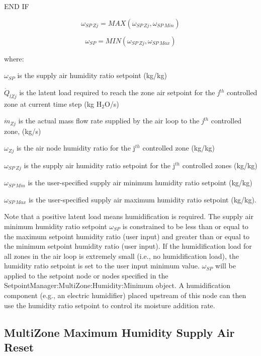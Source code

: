 END IF

\begin{equation}
{\omega_{SP~Zj}} = MAX\left( {{\omega_{SP~Zj}},{\omega_{SP~Min}}} \right)
\end{equation}

\begin{equation}
{\omega_{SP}} = MIN\left( {{\omega_{SP~Zj}},{\omega_{SP~Max}}} \right)
\end{equation}

where:

\({\omega_{SP}}\) is the supply air humidity ratio setpoint (kg/kg)

\({\dot Q_{lZj}}\) is the latent load required to reach the zone air setpoint for the \emph{j}\(^{th}\) controlled zone at current time step (kg H\(_{2}\)O/s)

\({\dot m_{Zj}}\) is the actual mass flow rate supplied by the air loop to the \emph{j}\(^{th}\) controlled zone, (kg/s)

\({\omega_{Zj}}\) is the air node humidity ratio for the j\(^{th}\) controlled zone (kg/kg)

\({\omega_{SP~Zj}}\) is the supply air humidity ratio setpoint for the j\(^{th}\) controlled zones (kg/kg)

\({\omega_{SP~Min}}\) is the user-specified supply air minimum humidity ratio setpoint (kg/kg)

\({\omega_{SP~Max}}\) is the user-specified supply air maximum humidity ratio setpoint (kg/kg).

Note that a positive latent load means humidification is required. The supply air minimum humidity ratio setpoint \({\omega_{SP}}\) is constrained to be less than or equal to the maximum setpoint humidity ratio (user input) and greater than or equal to the minimum setpoint humidity ratio (user input). If the humidification load for all zones in the air loop is extremely small (i.e., no humidification load), the humidity ratio setpoint is set to the user input minimum value. \({\omega_{SP}}\) will be applied to the setpoint node or nodes specified in the SetpointManager:MultiZone:Humidity:Minimum object. A humidification component (e.g., an electric humidifier) placed upstream of this node can then use the humidity ratio setpoint to control its moisture addition rate.

\subsection{MultiZone Maximum Humidity Supply Air Reset}\label{multizone-maximum-humidity-supply-air-reset}

